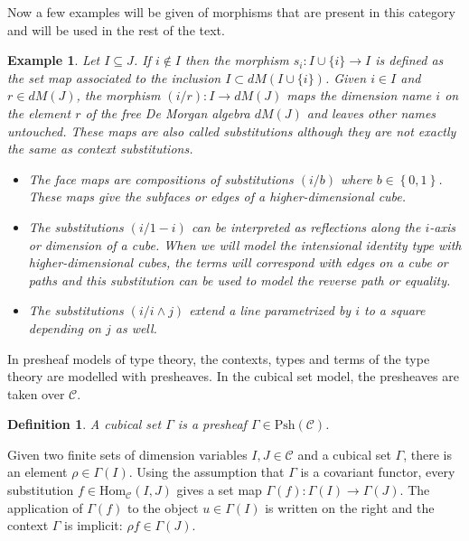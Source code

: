 \documentclass[12pt,a4paper,twoside,xetex,draft]{book}
\newcommand{\keyword}[1]{\emph{#1}\index{#1}}
\newtheorem{definition}[theorem]{Definition}
\newtheorem{example}[theorem]{Example}
\newcommand{\Psh}[1]{\text{Psh}\left(#1\right)}
\newcommand{\homo}[3]{\text{Hom}_{#1}\left(#2,#3\right)}
\begin{document}
Now a few examples will be given of morphisms that are present in this category and will be used in the rest of the text.

\begin{example}
Let $I \subseteq J$. If $i \not \in I$ then the morphism $s_i : I \cup \{i\} \rightarrow I$ is defined as the set map associated to the inclusion $I \subset dM(I\cup \{i \})$.  Given $i \in I$ and $r \in dM(J)$, the morphism $(i/r): I \rightarrow dM(J) $ maps the dimension name $i$ on the element $r$ of the free De Morgan algebra $dM(J)$ and leaves other names untouched. These maps are also called \keyword{substitutions} although they are not exactly the same as context substitutions. 
\begin{itemize}
\item The \keyword{face maps} are compositions of substitutions $(i/b)$ where $b\in \left\{0,1\right\}$. These maps give the subfaces or edges of a higher-dimensional cube.
\item The substitutions $(i / 1- i)$ can be interpreted as reflections along the $i$-axis or dimension of a cube. When we will model the intensional identity type with higher-dimensional cubes, the terms will correspond with edges on a cube or paths and this substitution can be used to model the reverse path or equality.
\item The substitutions $(i / i \wedge j)$ extend a line parametrized by $i$ to a square depending on $j$ as well.
\end{itemize}

\end{example}

In presheaf models of type theory, the contexts, types and terms of the type theory are modelled with presheaves. In the cubical set model, the presheaves are taken over $\mathcal{C}$.

\begin{definition}\label{cubset}
A \keyword{cubical set} $\Gamma$ is a presheaf $\Gamma \in \Psh{\mathcal{C}}$.
\end{definition}

Given two finite sets of dimension variables $I,J \in \mathcal{C}$ and a cubical set $\Gamma$,
there is an element $\rho \in \Gamma (I)$. Using the assumption that $\Gamma$ 
is a covariant functor, every substitution $f \in \homo{\mathcal{C}}{I}{J}$ gives a set map $\Gamma (f) : \Gamma (I) \rightarrow \Gamma (J)$. 
The application of $\Gamma(f)$ to the object $u \in \Gamma (I)$ is written on the right and the context $\Gamma$ is implicit: $\rho f \in \Gamma(J)$. 
\end{document}
